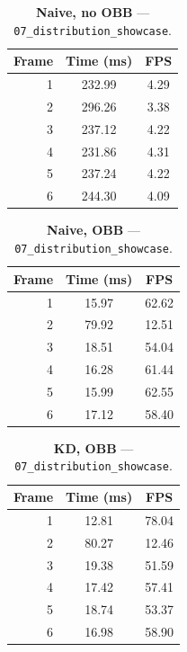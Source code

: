\begin{table}[htbp]
  \centering\small
  \setlength{\tabcolsep}{8pt}
  \begin{tabular}{@{}rcc@{}}
    \toprule
    \textbf{Frame} & \textbf{Time (ms)} & \textbf{FPS} \\
    \midrule
    1 & 232.99 & 4.29 \\
    2 & 296.26 & 3.38 \\
    3 & 237.12 & 4.22 \\
    4 & 231.86 & 4.31 \\
    5 & 237.24 & 4.22 \\
    6 & 244.30 & 4.09 \\
    \bottomrule
  \end{tabular}
  \caption{\textbf{Naive, no OBB} --- \texttt{07\_distribution\_showcase}.}
  \label{tab:rt-07-distribution-showcase-Naive-no-OBB}
\end{table}

\begin{table}[htbp]
  \centering\small
  \setlength{\tabcolsep}{8pt}
  \begin{tabular}{@{}rcc@{}}
    \toprule
    \textbf{Frame} & \textbf{Time (ms)} & \textbf{FPS} \\
    \midrule
    1 & 15.97 & 62.62 \\
    2 & 79.92 & 12.51 \\
    3 & 18.51 & 54.04 \\
    4 & 16.28 & 61.44 \\
    5 & 15.99 & 62.55 \\
    6 & 17.12 & 58.40 \\
    \bottomrule
  \end{tabular}
  \caption{\textbf{Naive, OBB} --- \texttt{07\_distribution\_showcase}.}
  \label{tab:rt-07-distribution-showcase-Naive-OBB}
\end{table}

\begin{table}[htbp]
  \centering\small
  \setlength{\tabcolsep}{8pt}
  \begin{tabular}{@{}rcc@{}}
    \toprule
    \textbf{Frame} & \textbf{Time (ms)} & \textbf{FPS} \\
    \midrule
    1 & 12.81 & 78.04 \\
    2 & 80.27 & 12.46 \\
    3 & 19.38 & 51.59 \\
    4 & 17.42 & 57.41 \\
    5 & 18.74 & 53.37 \\
    6 & 16.98 & 58.90 \\
    \bottomrule
  \end{tabular}
  \caption{\textbf{KD, OBB} --- \texttt{07\_distribution\_showcase}.}
  \label{tab:rt-07-distribution-showcase-KD-OBB}
\end{table}

